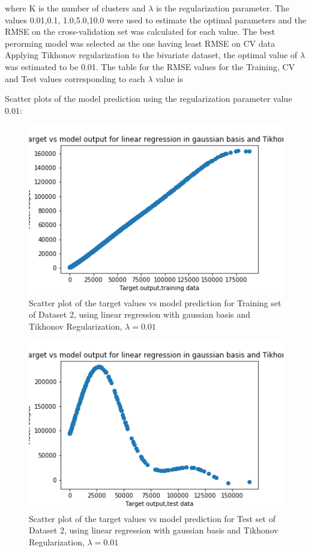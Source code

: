 \documentclass[12pt,a4paper]{article}
\newcommand{\noi}{\noindent}
\begin{document}
where K is the number of clusters and $\lambda$ is the regularization parameter. The values 0.01,0.1, 1.0,5.0,10.0 were used to estimate the optimal parameters and the RMSE on the cross-validation set was calculated for each value. The best perorming model was selected as the one having least RMSE on CV data\\ 
Applying Tikhonov regularization to the bivariate dataset, the optimal value of $\lambda$ was estimated to be 0.01. 
 The table for the RMSE values for the Training, CV and Test values corresponding to each $\lambda$ value is


\noi
Scatter plots of the model prediction using the regularization parameter value 0.01:
\begin{figure}[H]
     \centering
     \includegraphics[scale=0.5]{images/scatter_ds2tikhtr.png}
     \caption{Scatter plot of the target values vs model prediction for Training set of Dataset 2, using linear regression with gaussian basis and Tikhonov Regularization, $\lambda = 0.01 $}
\end{figure}
\begin{figure}[H]
     \centering
     \includegraphics[scale=0.5]{images/scatter_ds2tikhtest.png}
     \caption{Scatter plot of the target values vs model prediction for Test set of Dataset 2, using linear regression with gaussian basis and Tikhonov Regularization, $\lambda = 0.01 $}
\end{figure}
\end{document}
